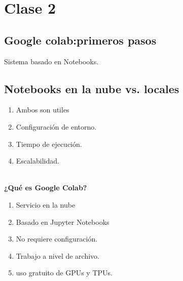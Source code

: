 \documentclass{article}
\begin{document}
    \section{Clase 2}
    \subsection{Google colab:primeros pasos}
    Sistema basado en Notebooks. 
    \subsection{Notebooks en la nube vs. locales}
    \begin{enumerate}
        \item Ambos son utiles
        \item Configuración de entorno. 
        \item Tiempo de ejecución. 
        \item Escalabilidad. 
    \end{enumerate}
    \\ \textbf{¿Qué es Google Colab?} \\ 
    \begin{enumerate}
        \item Servicio en la nube 
        \item Basado en Jupyter Notebooks
        \item No requiere configuración. 
        \item Trabajo a nivel de archivo. 
        \item uso gratuito de GPUs y TPUs. 
    \end{enumerate}
    
\end{document}
